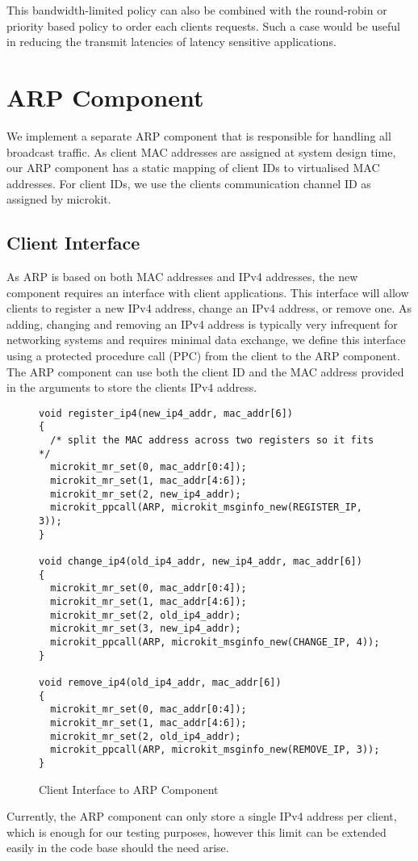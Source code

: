 This bandwidth-limited policy can also be combined with the round-robin or priority based policy
to order each clients requests. Such a case would be useful in reducing the 
transmit latencies of latency sensitive applications.\\ 


\section{ARP Component}

We implement a separate ARP component that is responsible for handling all broadcast traffic. 
As client MAC addresses are assigned at system design time, our ARP component has a static
mapping of client IDs to virtualised MAC addresses. For client IDs, we use the clients 
communication channel ID as assigned by microkit. 

\subsection{Client Interface}
As ARP is based on both MAC addresses and IPv4 addresses, the new component
requires an interface with client applications. This interface will allow clients
to register a new IPv4 address, change an IPv4 address, or remove one. As adding,
changing and removing an IPv4 address is typically very infrequent for networking systems
and requires minimal data exchange, we define this interface using a protected procedure
call (PPC) from the client to the ARP component. The ARP component can use both the
client ID and the MAC address provided in the arguments to store the clients IPv4 address. 

\begin{figure} [H]
    \begin{verbatim}
void register_ip4(new_ip4_addr, mac_addr[6])
{
  /* split the MAC address across two registers so it fits */
  microkit_mr_set(0, mac_addr[0:4]);
  microkit_mr_set(1, mac_addr[4:6]);
  microkit_mr_set(2, new_ip4_addr);
  microkit_ppcall(ARP, microkit_msginfo_new(REGISTER_IP, 3));
}

void change_ip4(old_ip4_addr, new_ip4_addr, mac_addr[6])
{
  microkit_mr_set(0, mac_addr[0:4]);
  microkit_mr_set(1, mac_addr[4:6]);
  microkit_mr_set(2, old_ip4_addr);
  microkit_mr_set(3, new_ip4_addr);
  microkit_ppcall(ARP, microkit_msginfo_new(CHANGE_IP, 4));
}  

void remove_ip4(old_ip4_addr, mac_addr[6])
{
  microkit_mr_set(0, mac_addr[0:4]);
  microkit_mr_set(1, mac_addr[4:6]);
  microkit_mr_set(2, old_ip4_addr);
  microkit_ppcall(ARP, microkit_msginfo_new(REMOVE_IP, 3));
}
\end{verbatim}
\caption{Client Interface to ARP Component}
\label{l:arpintf}
\end{figure}

Currently, the ARP component can only store a single IPv4 address per client, which
is enough for our testing purposes, however this limit can be extended easily in the code
base should the need arise.\\
